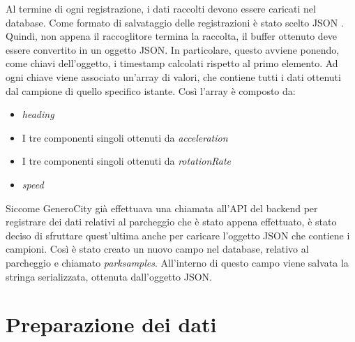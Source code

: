 Al termine di ogni registrazione, i dati raccolti devono essere caricati nel database.
Come formato di salvataggio delle registrazioni è stato scelto JSON \cite{json_data_exchanging}. 
Quindi, non appena
il raccoglitore termina la raccolta, il buffer ottenuto deve essere convertito in un 
oggetto JSON. In particolare, questo avviene ponendo, come chiavi dell'oggetto, i timestamp
calcolati rispetto al primo elemento. Ad ogni chiave viene associato un'array di valori, che
contiene tutti i dati ottenuti dal campione di quello specifico istante. Così l'array è
composto da:
\begin{itemize}
    \item \emph{heading}
    \item I tre componenti singoli ottenuti da \emph{acceleration}
    \item I tre componenti singoli ottenuti da \emph{rotationRate}
    \item \emph{speed}
\end{itemize}
Siccome GeneroCity già effettuava una chiamata all'API del backend per registrare dei dati
relativi al parcheggio che è stato appena effettuato, è stato deciso di sfruttare quest'ultima
anche per caricare l'oggetto JSON che contiene i campioni. Così è stato creato un nuovo campo
nel database, relativo al parcheggio e chiamato \emph{parksamples}. All'interno di questo campo
viene salvata la stringa serializzata, ottenuta dall'oggetto JSON.

\section{Preparazione dei dati} 

